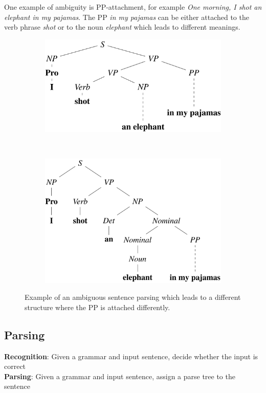 \documentclass[Report.tex]{subfiles}
\begin{document}
One example of ambiguity is PP-attachment, for example
\textit{One morning, I shot an elephant in my pajamas}. The PP \textit{in my
pajamas} can be either attached to the verb phrase \textit{shot} or to
the noun \textit{elephant} which leads to different meanings.
\begin{figure}[H]
\centering
\begin{subfigure}{0.5\textwidth}
\centering
\includegraphics[width=1\textwidth]{imgs/ambiguous-1.png}
\end{subfigure}%
~
\begin{subfigure}{0.5\textwidth}
\centering
\includegraphics[width=1\textwidth]{imgs/ambiguous-2.png}
\end{subfigure}
\caption{Example of an ambiguous sentence parsing which leads to a different structure where the PP is attached differently.}
\end{figure}

\subsection{Parsing}
\textbf{Recognition}: Given a grammar and input sentence, decide whether the
input is correct \\
\textbf{Parsing}: Given a grammar and input sentence, assign a parse tree
to the sentence
\end{document}
